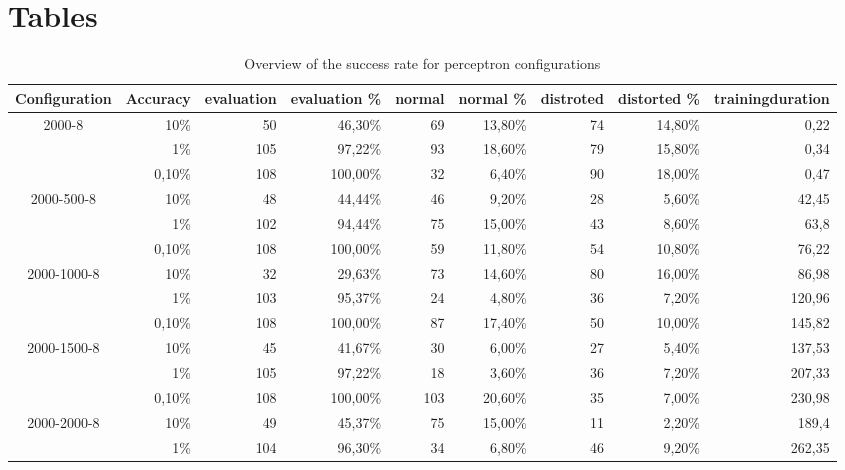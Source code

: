 \documentclass[pdftex,a4paper,12pt,twoside]{report}
\theoremstyle{plain} \newtheorem{theorem}{Theorem} \newtheorem{proposition}{Proposition} \newtheorem{lemma}{Lemma} \newtheorem*{corollary}{Corollary}
\theoremstyle{definition} \newtheorem{definition}{Definition} \newtheorem{conjecture}{Conjecture} \newtheorem*{example}{Example} \newtheorem{algorithm}{Algorithm}
\theoremstyle{remark} \newtheorem*{remark}{Remark} \newtheorem*{note}{Note} \newtheorem{case}{Case}
\begin{document}
\chapter{Tables}
\label{ch:tables}
\begin{table}
  \centering
  \caption{Overview of the success rate for perceptron configurations}
    \begin{tabular}{rrrrrrrrr}
    \toprule
    Configuration & Accuracy & evaluation & evaluation \% & normal & normal \% & distroted & distorted \% & trainingduration \\
    \midrule
    \multicolumn{1}{c}{\multirow{3}[0]{*}{2000-8}} & 10\%  & 50    & 46,30\% & 69    & 13,80\% & 74    & 14,80\% & 0,22 \\
    \multicolumn{1}{c}{} & 1\%   & 105   & 97,22\% & 93    & 18,60\% & 79    & 15,80\% & 0,34 \\
    \multicolumn{1}{c}{} & 0,10\% & 108   & 100,00\% & 32    & 6,40\% & 90    & 18,00\% & 0,47 \\
    \multicolumn{1}{c}{\multirow{3}[0]{*}{2000-500-8}} & 10\%  & 48    & 44,44\% & 46    & 9,20\% & 28    & 5,60\% & 42,45 \\
    \multicolumn{1}{c}{} & 1\%   & 102   & 94,44\% & 75    & 15,00\% & 43    & 8,60\% & 63,8 \\
    \multicolumn{1}{c}{} & 0,10\% & 108   & 100,00\% & 59    & 11,80\% & 54    & 10,80\% & 76,22 \\
    \multicolumn{1}{c}{\multirow{3}[0]{*}{2000-1000-8}} & 10\%  & 32    & 29,63\% & 73    & 14,60\% & 80    & 16,00\% & 86,98 \\
    \multicolumn{1}{c}{} & 1\%   & 103   & 95,37\% & 24    & 4,80\% & 36    & 7,20\% & 120,96 \\
    \multicolumn{1}{c}{} & 0,10\% & 108   & 100,00\% & 87    & 17,40\% & 50    & 10,00\% & 145,82 \\
    \multicolumn{1}{c}{\multirow{3}[0]{*}{2000-1500-8}} & 10\%  & 45    & 41,67\% & 30    & 6,00\% & 27    & 5,40\% & 137,53 \\
    \multicolumn{1}{c}{} & 1\%   & 105   & 97,22\% & 18    & 3,60\% & 36    & 7,20\% & 207,33 \\
    \multicolumn{1}{c}{} & 0,10\% & 108   & 100,00\% & 103   & 20,60\% & 35    & 7,00\% & 230,98 \\
    \multicolumn{1}{c}{\multirow{3}[0]{*}{2000-2000-8}} & 10\%  & 49    & 45,37\% & 75    & 15,00\% & 11    & 2,20\% & 189,4 \\
    \multicolumn{1}{c}{} & 1\%   & 104   & 96,30\% & 34    & 6,80\% & 46    & 9,20\% & 262,35 \\

\end{tabular}
\end{table}
\end{document}
